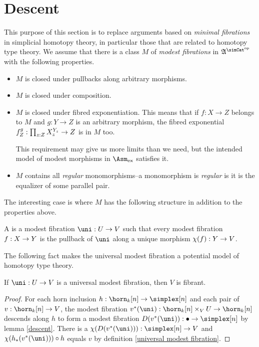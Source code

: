 \documentclass[csh.tex]{subfiles}
\begin{document}

\section{Descent} 
This purpose of this section is to replace arguments based on \emph{minimal fibrations} in simplicial homotopy theory, in particular those that are related to homotopy type theory. We assume that there is a class $M$ of \emph{modest fibrations} in $\ambient\s$ with the following properties.
\begin{itemize}
\item $M$ is closed under pullbacks along arbitrary morphisms.
\item $M$ is closed under composition.
\item $M$ is closed under fibred exponentiation. This means that if $f:X\to Z$ belongs to $M$ and $g:Y\to Z$ is an arbitrary morphism, the fibred exponential $f^g_Z:\prod_{z: Z} X_z^{Y_z}\to Z$ is in $M$ too.

This requirement may give us more limits than we need, but the intended model of modest morphisms in $\Asm\ex$ satisfies it.

\item $M$ contains all \emph{regular} monomorphisms--a monomorphism is \emph{regular} is it is the equalizer of some parallel pair.
\end{itemize} 

The interesting case is where $M$ has the following structure in addition to the properties above.

\newcommand\chm\chi
\begin{definition} A  is a modest fibration $\uni\of U\to V$ such that every modest fibration $f: X\to Y$ is the pullback of $\uni$ along a unique morphism $\chm(f)\of Y\to V$.
\end{definition}

The following fact makes the universal modest fibration a potential model of homotopy type theory.

\begin{theorem} If $\uni\of U\to V$ is a universal modest fibration, then $V$ is fibrant.
\end{theorem}

\begin{proof} For each horn inclusion $h\of \horn_k[n]\to\simplex[n]$ and each pair of $v\of \horn_k[n]\to V$, the modest fibration $v\ri(\uni)\of \horn_k[n]\times_V U \to \horn_k[n]$ descends along $h$ to form a modest fibration $D(v\ri(\uni))\of \bullet\to\simplex[n]$ by lemma \ref{descent}. There is a $\chm(D(v\ri(\uni)))\of\simplex[n]\to V$ and $\chm(h_*(v\ri(\uni)))\circ h$ equals $v$ by definition \ref{universal modest fibration}.
\end{proof}
\end{document}
